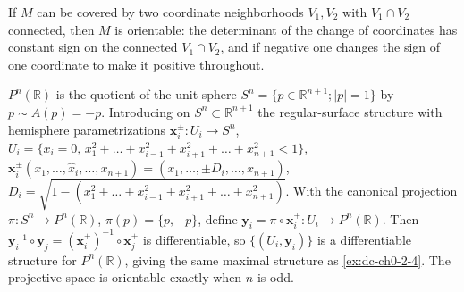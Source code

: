 \begin{example}
  \label{ex:dc-ch0-4-5}
  \notready
  If $M$ can be covered by two coordinate neighborhoods $V_1,V_2$ with
  $V_1\cap V_2$ connected, then $M$ is orientable: the determinant of the change of
  coordinates has constant sign on the connected $V_1\cap V_2$, and if negative one
  changes the sign of one coordinate to make it positive throughout.
\end{example}

\begin{example}
  \label{ex:dc-ch0-4-7}
  \notready
  $P^n(\mathbb{R})$ is the quotient of the unit sphere $S^n=\{p\in\mathbb{R}^{n+1};
  |p|=1\}$ by $p\sim A(p)=-p$. Introducing on $S^n\subset\mathbb{R}^{n+1}$ the
  regular-surface structure with hemisphere parametrizations
  $\mathbf{x}_i^{\pm}:U_i\to S^n$,
  $U_i=\{x_i=0,\,x_1^2+\dots+x_{i-1}^2+x_{i+1}^2+\dots+x_{n+1}^2<1\}$,
  $\mathbf{x}_i^{\pm}(x_1,\dots,\hat x_i,\dots,x_{n+1})=(x_1,\dots,\pm D_i,\dots,x_{n+1})$,
  $D_i=\sqrt{1-(x_1^2+\dots+x_{i-1}^2+x_{i+1}^2+\dots+x_{n+1}^2)}$. With the
  canonical projection $\pi:S^n\to P^n(\mathbb{R})$, $\pi(p)=\{p,-p\}$, define
  $\mathbf{y}_i=\pi\circ\mathbf{x}_i^+:U_i\to P^n(\mathbb{R})$. Then
  $\mathbf{y}_i^{-1}\circ\mathbf{y}_j=(\mathbf{x}_i^+)^{-1}\circ\mathbf{x}_j^+$ is
  differentiable, so $\{(U_i,\mathbf{y}_i)\}$ is a differentiable structure for
  $P^n(\mathbb{R})$, giving the same maximal structure as \cref{ex:dc-ch0-2-4}.
  The projective space is orientable exactly when $n$ is odd.
\end{example}

